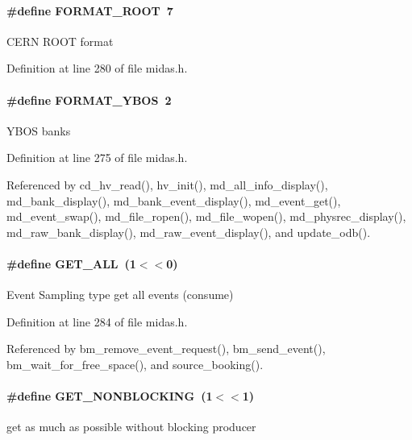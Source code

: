 \paragraph[{FORMAT\_\-ROOT}]{\setlength{\rightskip}{0pt plus 5cm}\#define FORMAT\_\-ROOT~7}\hfill\label{group__mdefineh_ga9663ae12f7cbf4295b3804ebd335e408}
CERN ROOT format 

Definition at line 280 of file midas.h.
\paragraph[{FORMAT\_\-YBOS}]{\setlength{\rightskip}{0pt plus 5cm}\#define FORMAT\_\-YBOS~2}\hfill\label{group__mdefineh_gaab9657af955d54be6cd05e0a726ad964}
YBOS banks 

Definition at line 275 of file midas.h.

Referenced by cd\_\-hv\_\-read(), hv\_\-init(), md\_\-all\_\-info\_\-display(), md\_\-bank\_\-display(), md\_\-bank\_\-event\_\-display(), md\_\-event\_\-get(), md\_\-event\_\-swap(), md\_\-file\_\-ropen(), md\_\-file\_\-wopen(), md\_\-physrec\_\-display(), md\_\-raw\_\-bank\_\-display(), md\_\-raw\_\-event\_\-display(), and update\_\-odb().
\paragraph[{GET\_\-ALL}]{\setlength{\rightskip}{0pt plus 5cm}\#define GET\_\-ALL~(1$<$$<$0)}\hfill\label{group__mdefineh_ga16218704fdf35f7624064c9d1d4bc78f}
Event Sampling type get all events (consume) 

Definition at line 284 of file midas.h.

Referenced by bm\_\-remove\_\-event\_\-request(), bm\_\-send\_\-event(), bm\_\-wait\_\-for\_\-free\_\-space(), and source\_\-booking().
\paragraph[{GET\_\-NONBLOCKING}]{\setlength{\rightskip}{0pt plus 5cm}\#define GET\_\-NONBLOCKING~(1$<$$<$1)}\hfill\label{group__mdefineh_ga0c91e56af17a9a23f5adab8a4099fac6}
get as much as possible without blocking producer 

